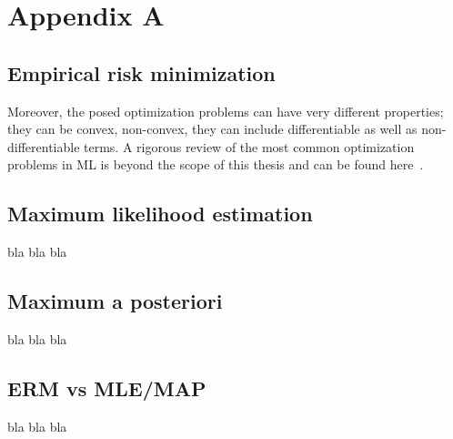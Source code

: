 
\chapter*{Appendix A} \label{appendix:A}
\section*{Empirical risk minimization} \label{sec:erm}
Moreover, the posed optimization problems can have very different properties; they can be convex, non-convex, they can include differentiable as well as non-differentiable terms. A rigorous review of the most common optimization problems in ML is beyond the scope of this thesis and can be found here~\cite{boyd2004convex, bach2012optimization, sra2012optimization, nesterov2013introductory}.


\section*{Maximum likelihood estimation} \label{sec:mle}
bla bla bla

\section*{Maximum a posteriori} \label{sec:map}
bla bla bla

\section*{ERM vs MLE/MAP} \label{sec:erm-mlemap_connection}
bla bla bla